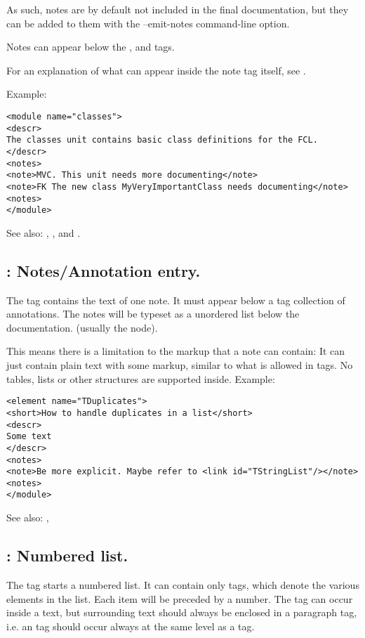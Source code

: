 As such, notes are by default not included in the final documentation, but they can be added to 
them with the --emit-notes command-line option.

Notes can appear below the ,  and  tags.

For an explanation of what can appear inside the note tag itself, see .

Example:
\begin{verbatim}
<module name="classes">
<descr>
The classes unit contains basic class definitions for the FCL.
</descr>
<notes>
<note>MVC. This unit needs more documenting</note>
<note>FK The new class MyVeryImportantClass needs documenting</note>
<notes>
</module>
\end{verbatim}

See also: , ,  and .

\subsection{ : Notes/Annotation entry.}
\label{tag:notes}
The  tag contains the text of one note. It must appear below a tag  
collection of annotations. The notes will be typeset as a unordered list below the documentation. 
(usually the  node).

This means there is a limitation to the markup that a note can contain:
It can just contain plain text with some markup, similar to what is allowed in  tags.
No tables, lists or other structures are supported inside.
Example:
\begin{verbatim}
<element name="TDuplicates">
<short>How to handle duplicates in a list</short>
<descr>
Some text
</descr>
<notes>
<note>Be more explicit. Maybe refer to <link id="TStringList"/></note>
<notes>
</module>
\end{verbatim}

See also: , 

\subsection{ : Numbered list.}
\label{tag:ol}
The  tag starts a numbered list. It can contain only 
tags, which denote the various elements in the list. Each item will be
preceded by a number. The  tag can
occur inside a text, but surrounding text should always be enclosed in a
 paragraph tag, i.e. an  tag should occur always at the
same level as a  tag.

